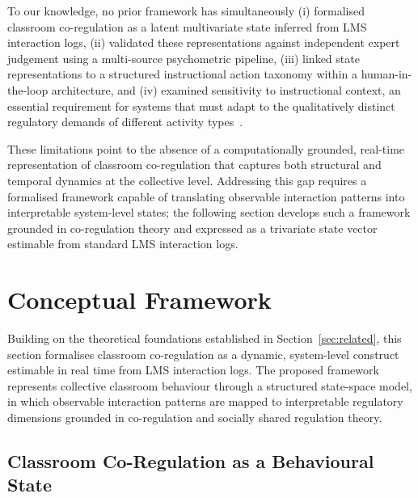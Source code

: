 \documentclass[preprint,12pt,authoryear]{elsarticle}
\begin{document}
To our knowledge, no prior framework has simultaneously (i) formalised classroom co-regulation as a latent multivariate state inferred from LMS interaction logs, (ii) validated these representations against independent expert judgement using a multi-source psychometric pipeline, (iii) linked state representations to a structured instructional action taxonomy within a human-in-the-loop architecture, and (iv) examined sensitivity to instructional context, an essential requirement for systems that must adapt to the qualitatively distinct regulatory demands of different activity types~\citep{feng2023, olsen2021, pan2024}.

These limitations point to the absence of a computationally grounded, real-time representation of classroom co-regulation that captures both structural and temporal dynamics at the collective level. Addressing this gap requires a formalised framework capable of translating observable interaction patterns into interpretable system-level states; the following section develops such a framework grounded in co-regulation theory and expressed as a trivariate state vector estimable from standard LMS interaction logs.




\section{Conceptual Framework}
\label{sec:framework}

Building on the theoretical foundations established in Section~\ref{sec:related}, this section formalises classroom co-regulation as a dynamic, system-level construct estimable in real time from LMS interaction logs. The proposed framework represents collective classroom behaviour through a structured state-space model, in which observable interaction patterns are mapped to interpretable regulatory dimensions grounded in co-regulation and socially shared regulation theory.

\subsection{Classroom Co-Regulation as a Behavioural State}
\label{sec:framework_state}
\end{document}
